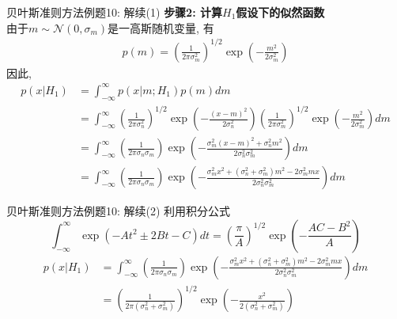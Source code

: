 \begin{frame}[shrink]{贝叶斯准则方法例题10: 解续(1)}
\textbf{步骤2: 计算$H_1$假设下的似然函数}\\
由于$m\sim\mathcal{N}(0, \sigma_m)$是一高斯随机变量, 有
\begin{align*}
p(m)=\left(\frac{1}{2\pi\sigma_m^2}\right)^{1/2}\exp\left(-\frac{m^2}{2\sigma_m^2}\right)
\end{align*}
因此, 
\begin{align*}
p(x|H_1)&=\int_{-\infty}^{\infty}p(x|m; H_1)p(m)dm\\
&=\int_{-\infty}^{\infty}\left(\frac{1}{2\pi\sigma_n^2}\right)^{1/2}\exp\left(-\frac{(x-m)^2}{2\sigma_n^2}\right)\left(\frac{1}{2\pi\sigma_m^2}\right)^{1/2}\exp\left(-\frac{m^2}{2\sigma_m^2}\right)dm\\
&=\int_{-\infty}^{\infty}\left(\frac{1}{2\pi\sigma_n\sigma_m}\right)\exp\left(-\frac{\sigma_m^2(x-m)^2+\sigma_n^2m^2}{2\sigma_n^2\sigma_m^2}\right)dm\\
&=\int_{-\infty}^{\infty}\left(\frac{1}{2\pi\sigma_n\sigma_m}\right)\exp\left(-\frac{\sigma_m^2x^2+(\sigma_n^2+\sigma_m^2)m^2-2\sigma_m^2mx}{2\sigma_n^2\sigma_m^2}\right)dm
\end{align*} 
\end{frame}

\begin{frame}[shrink]{贝叶斯准则方法例题10: 解续(2)}
利用积分公式
\[ \int_{-\infty}^{\infty}\exp(-At^2\pm 2Bt-C)dt=\left(\frac{\pi}{A}\right)^{1/2}\exp\left(-\frac{AC-B^2}{A} \right) \]
\begin{align*}
p(x|H_1)&=\int_{-\infty}^{\infty}\left(\frac{1}{2\pi\sigma_n\sigma_m}\right)\exp\left(-\frac{\sigma_m^2x^2+(\sigma_n^2+\sigma_m^2)m^2-2\sigma_m^2mx}{2\sigma_n^2\sigma_m^2}\right)dm\\
&=\left(\frac{1}{2\pi(\sigma_n^2+\sigma_m^2)}\right)^{1/2}\exp\left(-\frac{x^2}{2(\sigma_n^2+\sigma_m^2)}\right)
\end{align*}
\end{frame}

